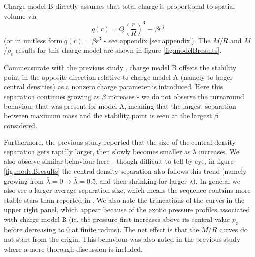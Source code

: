 \documentclass[12pt,noshowpacs,nofootinbib,notitlepage,amsmath,superscriptaddress]{revtex4-1}%
\begin{document}
Charge model B directly assumes that total charge is proportional to spatial volume \cite{zhang:2021,Goncalves:2020joq,Arbanil:2015uoa} via 
$$
q(r)=Q\left(\frac{r}{R}\right)^3\equiv\beta r^3
$$ 
(or in unitless form $\bar{q}(\bar{r})=\bar{\beta}\bar{r}^3$ - see appendix \ref{sec:appendix}). The $M$/$R$ and $M$/$\rho_\mathrm{c}$ results for this charge model are shown in figure \ref{fig:modelBresults}. 

Commensurate with the previous study \cite{zhang:2021}, charge model B offsets the stability point in the opposite direction relative to charge model A (namely to larger central densities) as a nonzero charge parameter is introduced. Here this separation continues growing as $\beta$ increases - we do not observe the turnaround behaviour that was present for model A, meaning that the largest separation between maximum mass and the stability point is seen at the largest $\beta$ considered. 

Furthermore, the previous study
\cite{zhang:2021} reported that the  size of the central density separation  gets rapidly larger, then slowly becomes smaller as $\bar{\lambda}$ increases. We also observe similar behaviour here - though difficult to tell by eye,   in figure \ref{fig:modelBresults} the central density separation also follows this trend (namely growing from $\bar{\lambda}=0\to\bar{\lambda}=0.5$, and then shrinking for larger $\lambda$). In general we also see a larger average separation size,   which means the sequence contains more stable stars than reported in \cite{zhang:2021}. We also note the  truncations of the curves in the upper right panel, which  appear because of the exotic pressure profiles associated with charge model B (ie. the pressure first increases above its central value $p_\mathrm{c}$ before decreasing to 0 at finite radius). The net effect is that the $M$/$R$ curves   do not start from the origin. This behaviour was also noted in the previous study \cite{zhang:2021} where a more thorough discussion   is included.
\end{document}
